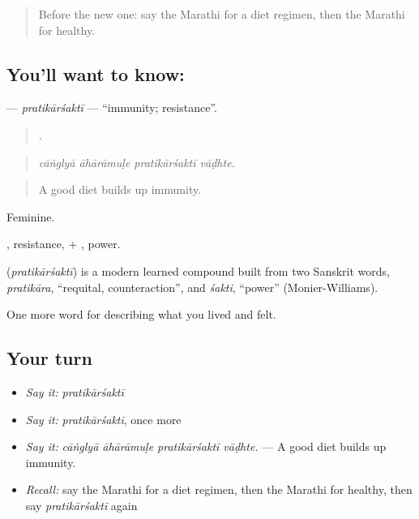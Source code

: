\label{lesson:MR-C490-pratikarsakti}



\begin{quote}
Before the new one: say the Marathi for a diet regimen, then the Marathi for healthy.
\end{quote}

\subsection*{You'll want to know: }
\textbf{} — \emph{pratikārśaktī} — \textquotedblleft{}immunity; resistance\textquotedblright{}.

\begin{quote}
   .
\end{quote}

\begin{quote}
\emph{cāṅglyā āhārāmuḷe pratikārśaktī vāḍhte.}
\end{quote}

\begin{quote}
A good diet builds up immunity.
\end{quote}

Feminine.

, resistance, + , power.

\begin{cousinweb}
\textbf{} (\emph{pratikārśaktī}) is a modern learned compound built from two Sanskrit words, \emph{pratikāra}, \textquotedblleft{}requital, counteraction\textquotedblright{}, and \emph{śakti}, \textquotedblleft{}power\textquotedblright{} (Monier-Williams).
\end{cousinweb}

\begin{grammarlens}[title={What you've built}]
One more word for describing what you lived and felt.
\end{grammarlens}

\subsection*{Your turn}
\begin{itemize}
\raggedright
  \item \emph{Say it:} \emph{pratikārśaktī}
  \item \emph{Say it:} \emph{pratikārśaktī}, once more
  \item \emph{Say it:} \emph{cāṅglyā āhārāmuḷe pratikārśaktī vāḍhte.} — A good diet builds up immunity.
  \item \emph{Recall:} say the Marathi for a diet regimen, then the Marathi for healthy, then say \emph{pratikārśaktī} again
\end{itemize}

